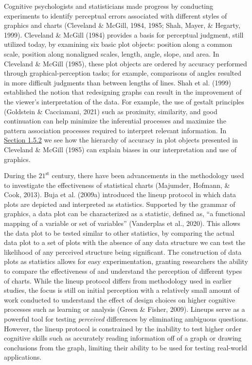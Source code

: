 \documentclass[print]{nuthesis}
\begin{document}
Cognitive psychologists and statisticians made progress by conducting experiments to identify perceptual errors associated with different styles of graphics and charts (Cleveland \& McGill, 1984, 1985; Shah, Mayer, \& Hegarty, 1999).
Cleveland \& McGill (1984) provides a basis for perceptual judgment, still utilized today, by examining six basic plot objects: position along a common scale, position along nonaligned scales, length, angle, slope, and area.
In Cleveland \& McGill (1985), these plot objects are ordered by accuracy performed through graphical-perception tasks; for example, comparisons of angles resulted in more difficult judgments than between lengths of lines.
Shah et al. (1999) established the notion that redesigning graphs can result in the improvement of the viewer's interpretation of the data.
For example, the use of gestalt principles (Goldstein \& Cacciamani, 2021) such as proximity, similarity, and good continuation can help minimize the inferential processes and maximize the pattern association processes required to interpret relevant information.
In \protect\hyperlink{underestimation}{Section 1.5.2} we see how the hierarchy of accuracy in plot objects presented in Cleveland \& McGill (1985) can explain biases in our interpretation and use of graphics.

During the \(\text{21}^{\text{st}}\) century, there have been advancements in the methodology used to investigate the effectiveness of statistical charts (Majumder, Hofmann, \& Cook, 2013).
Buja et al. (2009a) introduced the lineup protocol in which data plots are depicted and interpreted as statistics.
Supported by the grammar of graphics, a data plot can be characterized as a statistic, defined as, ``a functional mapping of a variable or set of variables'' (Vanderplas et al., 2020).
This allows the data plot to be tested similar to other statistics, by comparing the actual data plot to a set of plots with the absence of any data structure we can test the likelihood of any perceived structure being significant.
The construction of data plots as statistics allows for easy experimentation, granting researchers the ability to compare the effectiveness of and understand the perception of different types of charts.
While the lineup protocol differs from methodology used in earlier studies, the focus is still on initial perception with a relatively small amount of work conducted to understand the effect of design choices on higher cognitive processes such as learning or analysis (Green \& Fisher, 2009).
Lineups serve as a powerful tool for testing \emph{perceived} differences by eliminating ambiguous questions.
However, the lineup protocol is constrained by the inability to test higher order cognitive skills such as accurately reading information off of a graph or drawing conclusions from the graph, limiting their ability to be used for testing real-world applications.
\end{document}
